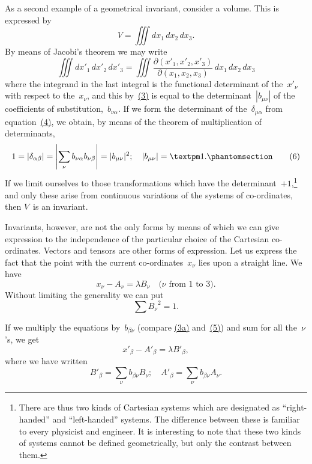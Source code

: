\documentclass[12pt]{book}[2005/09/16]
\newcommand{\Change}[2]{#2}
\newcommand{\Add}[1]{\Change{}{#1}}
\newcommand{\PageSep}[1]{\ignorespaces}
\newcommand{\Tag}[1]{%
  \phantomsection
  \label{eqn:#1}
  \tag*{#1}
}
\newcommand{\Eqref}[1]{\hyperref[eqn:#1]{#1}}
\newcommand{\dd}{\partial}
\begin{document}
As a second example of a geometrical invariant, consider
a volume. This is expressed by
\[
V = \iiint dx_{1}\, dx_{2}\, dx_{3}.
\]
By means of Jacobi's theorem we may write
\[
\iiint {dx'}_{1}\, {dx'}_{2}\, {dx'}_{3}
  = \iiint \frac{\dd({x'}_{1}, {x'}_{2}, {x'}_{3})}{\dd(x_{1}, x_{2}, x_{3})}\,
    dx_{1}\, dx_{2}\, dx_{3}
\]
\PageSep{11}
where the integrand in the last integral is the functional
determinant of the~${x'}_{\nu}$ with respect to the~$x_{\nu}$, and this by~\Eqref{(3)}
is equal to the determinant~$|b_{\mu\nu}|$ of the coefficients
of substitution,~$b_{\nu\alpha}$. If we form the determinant of the~$\delta_{\mu\alpha}$
from equation~\Eqref{(4)}, we obtain, by means of the theorem
of multiplication of determinants,
\[
1 = |\delta_{\alpha\beta}|
  = \left| \sum_{\nu} b_{\nu\alpha} b_{\nu\beta}\right|
  = |b_{\mu\nu}|^{2};\quad
|b_{\mu\nu}| = ±1\Add{.}
\Tag{(6)}
\]
If we limit ourselves to those transformations which have
the determinant~$+1$,\footnote
  {There are thus two kinds of Cartesian systems which are designated
  as ``right-handed'' and ``left-handed'' systems. The difference between
  these is familiar to every physicist and engineer. It is interesting to note
  that these two kinds of systems cannot be defined geometrically, but only
  the contrast between them.}
and only these arise from continuous
variations of the systems of co-ordinates, then $V$~is
an invariant.

Invariants, however, are not the only forms by means
of which we can give expression to the independence of
the particular choice of the Cartesian co-ordinates. Vectors
and tensors are other forms of expression. Let us express
the fact that the point with the current co-ordinates~$x_{\nu}$ lies
upon a straight line. We have
\[
x_{\nu} - A_{\nu} = \lambda B_{\nu}\quad
  \text{($\nu$~from $1$~to~$3$).}
\]
Without limiting the generality we can put
\[
\sum {B_{\nu}}^{2} = 1.
\]

If we multiply the equations by~$b_{\beta\nu}$ (compare \Eqref{(3a)} and~\Eqref{(5)})
and sum for all the~$\nu$'s, we get
\[
{x'}_{\beta} - {A'}_{\beta} = \lambda {B'}_{\beta}\Add{,}
\]
\PageSep{12}
where we have written
\[
{B'}_{\beta} = \sum_{\nu} b_{\beta\nu} B_{\nu}; \quad
{A'}_{\beta} = \sum_{\nu} b_{\beta\nu} A_{\nu}.
\]
\end{document}
